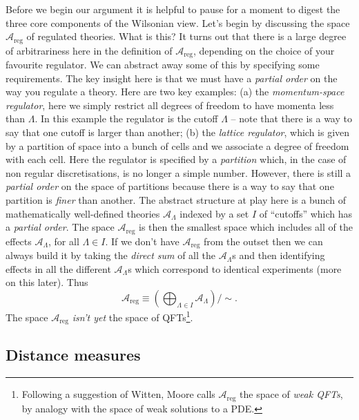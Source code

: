 \documentclass[11pt]{amsart}
\theoremstyle{plain}%
\theoremstyle{definition}
\theoremstyle{remark}
\begin{document}
Before we begin our argument it is helpful to pause for a moment to digest the three core components of the Wilsonian view. Let's begin by discussing the space $\mathcal{A}_{\text{reg}}$ of regulated theories. What is this? It turns out that there is a large degree of arbitrariness here in the definition of $\mathcal{A}_{\text{reg}}$, depending on the choice of your favourite regulator. We can abstract away some of this by specifying some requirements. The key insight here is that we must have a \emph{partial order} on the way you regulate a theory. Here are two key examples: (a) the \emph{momentum-space regulator}, here we simply restrict all degrees of freedom to have momenta less than $\Lambda$. In this example the regulator is the cutoff $\Lambda$ -- note that there is a way to say that one cutoff is larger than another; (b) the \emph{lattice regulator}, which is given by a partition of space into a bunch of cells and we associate a degree of freedom with each cell. Here the regulator is specified by a \emph{partition} which, in the case of non regular discretisations, is no longer a simple number. However, there is still a \emph{partial order} on the space of partitions because there is a way to say that one partition is \emph{finer} than another. The abstract structure at play here is a bunch of mathematically well-defined theories $\mathcal{A}_\Lambda$ indexed by a set $I$ of ``cutoffs'' which has a \emph{partial order}. The space $\mathcal{A}_{\text{reg}}$ is then the smallest space which includes all of the effects $\mathcal{A}_\Lambda$, for all $\Lambda \in I$. If we don't have $\mathcal{A}_{\text{reg}}$ from the outset then we can always build it by taking the \emph{direct sum} of all the $\mathcal{A}_\Lambda$s and then identifying effects in all the different $\mathcal{A}_\Lambda$s which correspond to identical experiments (more on this later). Thus 
\begin{equation}
	\mathcal{A}_{\text{reg}} \equiv \left(\bigoplus_{\Lambda \in I} \mathcal{A}_\Lambda\right)\Bigg/\sim.
\end{equation} 
The space $\mathcal{A}_{\text{reg}}$ \emph{isn't yet} the space of QFTs\footnote{Following a suggestion of Witten, Moore calls $\mathcal{A}_{\text{reg}}$ the space of \emph{weak QFTs}, by analogy with the space of weak solutions to a PDE.}.


\subsection{Distance measures}
\end{document}
